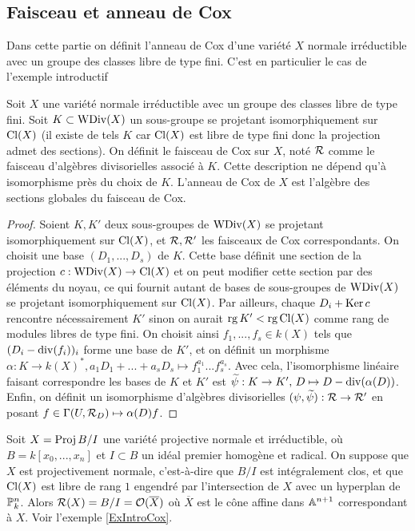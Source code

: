 \subsection{Faisceau et anneau de Cox}

Dans cette partie on définit l'anneau de Cox d'une variété $X$ normale irréductible avec un groupe des classes libre de type fini. C'est en particulier le cas de l'exemple introductif

\begin{cons}\label{consFreeCoxRing}
Soit $X$ une variété normale irréductible avec un groupe des classes libre de type fini. Soit $K\subset \operatorname{WDiv}(X)$ un sous-groupe se projetant isomorphiquement sur $\operatorname{Cl}(X)$ (il existe de tels $K$ car $\operatorname{Cl}(X)$ est libre de type fini donc la projection admet des sections). On définit le faisceau de Cox sur $X$, noté $\mathcal{R}$ comme le faisceau d'algèbres divisorielles associé à $K$. Cette description ne dépend qu'à isomorphisme près du choix de $K$. L'anneau de Cox de $X$ est l'algèbre des sections globales du faisceau de Cox. 
\end{cons}
\begin{proof}
Soient $K,K'$ deux sous-groupes de $\operatorname{WDiv}(X)$ se projetant isomorphiquement sur $\operatorname{Cl}(X)$, et $\mathcal{R},\mathcal{R}'$ les faisceaux de Cox correspondants. On choisit une base $(D_1,...,D_s)$ de $K$. Cette base définit une section de la projection $c:\operatorname{WDiv}(X)\rightarrow \operatorname{Cl}(X)$ et on peut modifier cette section par des éléments du noyau, ce qui fournit autant de bases de sous-groupes de $\operatorname{WDiv}(X)$ se projetant isomorphiquement sur $\operatorname{Cl}(X)$. Par ailleurs, chaque $D_i+\operatorname{Ker} c$ rencontre nécessairement $K'$ sinon on aurait $\operatorname{rg} K' < \operatorname{rg} \operatorname{Cl}(X)$ comme rang de modules libres de type fini. On choisit ainsi $f_1,...,f_s\in k(X)$ tels que $(D_i-\operatorname{div}(f_i))_i$ forme une base de $K'$, et on définit un morphisme $\alpha:K\rightarrow k(X)^*, a_1D_1+...+a_sD_s\mapsto f_1^{a_1}...f_s^{a_s}$. Avec cela, l'isomorphisme linéaire faisant correspondre les bases de $K$ et $K'$ est $\widetilde{\psi}:K\rightarrow K',\, D\mapsto D-\operatorname{div}(\alpha(D))$. Enfin, on définit un isomorphisme d'algèbres divisorielles $(\psi, \widetilde{\psi}): \mathcal{R}\rightarrow\mathcal{R}'$ en posant $f\in \Gamma(U, \mathcal{R}_D)\mapsto \alpha(D)f$.
\end{proof}

\begin{ex}
Soit $X=\operatorname{Proj} B/I$ une variété projective normale et irréductible, où $B=k[x_0,...,x_n]$ et $I\subset B$ un idéal premier homogène et radical. On suppose que $X$ est projectivement normale, c'est-à-dire que $B/I$ est intégralement clos, et que $\operatorname{Cl}(X)$ est libre de rang $1$ engendré par l'intersection de $X$ avec un hyperplan de $\mathbb{P}^n_k$. Alors $\mathcal{R}(X)=B/I=\mathcal{O}(\overline{X})$ où $\overline{X}$ est le cône affine dans $\mathbb{A}^{n+1}$ correspondant à $X$. Voir l'exemple \ref{ExIntroCox}.
\end{ex}

